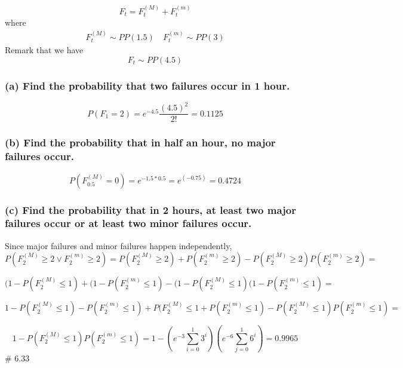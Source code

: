 \documentclass[]{article}
\begin{document}
\[
F_t =  F_t^{(M)} + F_t^{(m)}
\] where \[
\begin{array}{c}
F_t^{(M)} \sim PP(1.5)\ & F_t ^{(m)} \sim PP(3)
\end{array}
\] Remark that we have \[
F_t \sim PP(4.5)
\]

\hypertarget{a-find-the-probability-that-two-failures-occur-in-1-hour.}{%
\subsubsection{(a) Find the probability that two failures occur in 1
hour.}\label{a-find-the-probability-that-two-failures-occur-in-1-hour.}}

\[
P(F_1 = 2) = e^{-4.5}\frac{(4.5)^2}{2!} = 0.1125
\]

\hypertarget{b-find-the-probability-that-in-half-an-hour-no-major-failures-occur.}{%
\subsubsection{(b) Find the probability that in half an hour, no major
failures
occur.}\label{b-find-the-probability-that-in-half-an-hour-no-major-failures-occur.}}

\[
P(F_{0.5}^{(M)}= 0) = e^{-1.5 * 0.5} = e^{(-0.75)} = 0.4724
\]

\hypertarget{c-find-the-probability-that-in-2-hours-at-least-two-major-failures-occur-or-at-least-two-minor-failures-occur.}{%
\subsubsection{(c) Find the probability that in 2 hours, at least two
major failures occur or at least two minor failures
occur.}\label{c-find-the-probability-that-in-2-hours-at-least-two-major-failures-occur-or-at-least-two-minor-failures-occur.}}

Since major failures and minor failures happen independently, \[
P(F_2^{(M)} \geq 2 \lor F_2^{(m)} \geq 2) = P(F_2^{(M)} \geq 2) + P(F_2^{(m)} \geq 2) - P(F_2^{(M)} \geq 2 ) P( F_2^{(m)} \geq 2) =
\]

\[
(1-P(F_2^{(M)} \leq 1)  + (1-P(F_2^{(m)} \leq 1)  -  (1-P(F_2^{(M)} \leq 1) (1-P(F_2^{(m)} \leq 1) =
\]

\[
1 - P(F_2^{(M)} \leq 1)-P(F_2^{(m)} \leq 1) + P(F_2^{(M)} \leq 1 + P(F_2^{(m)} \leq 1) - P(F_2^{(M)} \leq 1)P(F_2^{(m)} \leq 1) =
\]

\[
1 - P(F_2^{(M)} \leq 1)P(F_2^{(m)} \leq 1) = 1 - (e^{-3}\sum_{i=0}^1 3^i )(e^{-6} \sum_{j=0}^1 6^i) = 0.9965
\] \# 6.33
\end{document}
